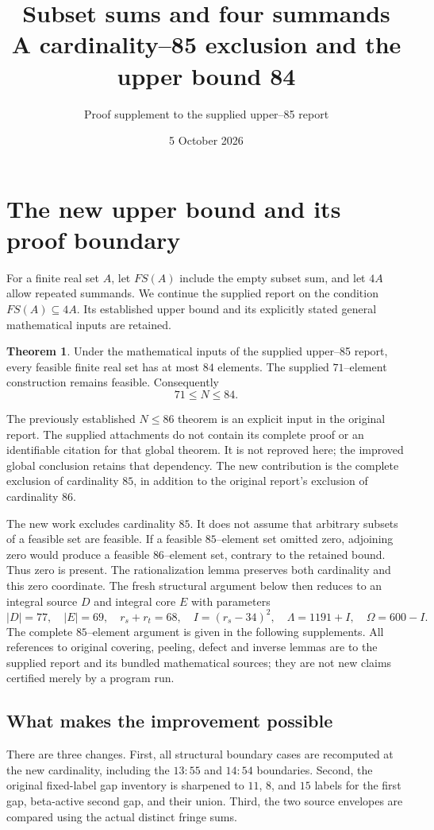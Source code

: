 \documentclass[10pt,a4paper]{article}
\title{Subset sums and four summands\\A cardinality--85 exclusion and the upper bound 84}
\author{Proof supplement to the supplied upper--85 report}
\date{5 October 2026}
\theoremstyle{definition}
\newtheorem{theorem}{Theorem}
\begin{document}
\maketitle
\begingroup\footnotesize\tableofcontents\endgroup
\clearpage
\section{The new upper bound and its proof boundary}
For a finite real set $A$, let $FS(A)$ include the empty subset sum, and let
$4A$ allow repeated summands. We continue the supplied report on the condition
$FS(A)\subseteq4A$. Its established upper bound and its explicitly stated
general mathematical inputs are retained.

\begin{theorem}
Under the mathematical inputs of the supplied upper--85 report, every feasible
finite real set has at most $84$ elements. The supplied $71$--element
construction remains feasible. Consequently
\[
                       71\le N\le84.
\]
\end{theorem}

The previously established $N\le86$ theorem is an explicit input in the
original report. The supplied attachments do not contain its complete proof
or an identifiable citation for that global theorem. It is not reproved here;
the improved global conclusion retains that dependency. The new contribution
is the complete exclusion of cardinality $85$, in addition to the original
report's exclusion of cardinality $86$.

The new work excludes cardinality $85$. It does not assume that arbitrary
subsets of a feasible set are feasible. If a feasible $85$--element set omitted
zero, adjoining zero would produce a feasible $86$--element set, contrary to
the retained bound. Thus zero is present. The rationalization lemma preserves
both cardinality and this zero coordinate. The fresh structural argument below
then reduces to an integral source $D$ and integral core $E$ with parameters
\[
 |D|=77,\quad |E|=69,\quad r_s+r_t=68,\quad
 I=(r_s-34)^2,\quad \Lambda=1191+I,\quad\Omega=600-I.
\]
The complete $85$--element argument is given in the following supplements.
All references to original covering, peeling, defect and inverse lemmas are to
the supplied report and its bundled mathematical sources; they are not new
claims certified merely by a program run.

\subsection{What makes the improvement possible}
There are three changes. First, all structural boundary cases are recomputed
at the new cardinality, including the $13:55$ and $14:54$ boundaries. Second,
the original fixed-label gap inventory is sharpened to $11$, $8$, and $15$
labels for the first gap, beta-active second gap, and their union. Third, the
two source envelopes are compared using the actual distinct fringe sums.
\end{document}
